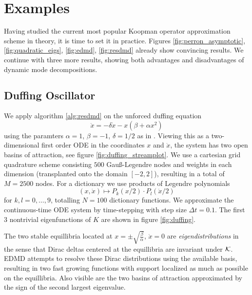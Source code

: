 
\section{Examples}\label{sec:benchmark}

Having studied the current most popular Koopman operator approximation scheme in theory, 
it is time to set it in practice. Figures \ref{fig:perron_asymptotic}, 
\ref{fig:quadratic_eigs}, \ref{fig:edmd}, \ref{fig:resdmd} already show convincing 
results. We continue with three more results, showing both advantages and disadvantages 
of dynamic mode decompositions. 

\subsection{Duffing Oscillator}\label{sec:duffing}

We apply algorithm \ref{alg:resdmd} on the unforced duffing equation \cite{duffing}
\begin{equation}
    \label{eq:duffing}
    \ddot{x} = - \delta \dot{x} - x (\beta + \alpha x^2)
\end{equation}
using the paramters $\alpha = 1$, $\beta = -1$, $\delta = 1/2$ as in \cite{edmd}. Viewing 
this as a two-dimensional first order ODE in the coordinates $x$ and $\dot{x}$, the system 
has two open basins of attraction, see figure \ref{fig:duffing_streamplot}. We use a cartesian 
grid quadrature scheme consisting $500$ Gauß-Legendre nodes and weights in each 
dimension (transplanted onto the domain $[-2,2]$), resulting in a total of $M = 2500$ 
nodes. For a dictionary we use products of Legendre polynomials
\begin{equation}
    (x, \dot{x}) \mapsto P_k (x/2) \cdot P_l (\dot{x}/2)
\end{equation}
for $k, l = 0, \ldots, 9$, totalling $N = 100$ dictionary functions. We approximate the 
continuous-time ODE system by time-stepping with step size $\Delta t = 0.1$. The first 
$3$ nontrivial eigenfunctions of $K$ are shown in figure \ref{fig:duffing}. 

The 
two stable equillibria located at $x = \pm \sqrt{\frac{\beta}{\alpha}}$, $\dot{x} = 0$ are 
\emph{eigendistributions} in the sense that Dirac deltas centered at the equillibria 
are invariant under $\mathcal{K}$. EDMD attempts to resolve these Dirac distributions using the 
available basis, resulting in two fast growing functions with support localized as much as 
possible on the equillibria. Also visible are the two basins of attraction approximated by 
the sign of the second largest eigenvalue. 

